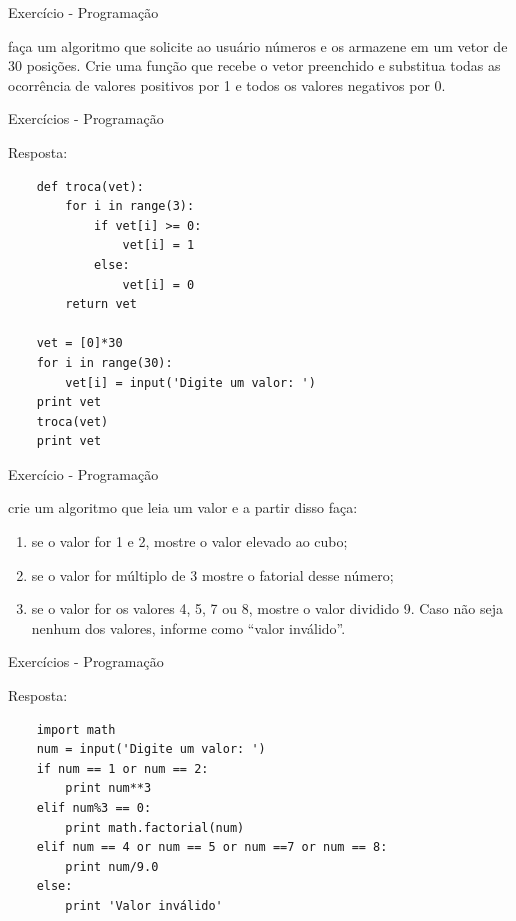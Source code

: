 \documentclass{beamer}
\begin{document}
\begin{frame}{Exercício - Programação}
	\label{exercicio_09}
	
	faça um algoritmo que solicite ao usuário números e os armazene em um vetor de 30 posições. Crie uma função que recebe o vetor preenchido e substitua todas as ocorrência de valores positivos por 1 e todos os valores negativos por 0.
	
\end{frame}

\begin{frame}[fragile]{Exercícios - Programação}
	\label{exercicio_09_resposta}
	
	Resposta:
	
\begin{verbatim}
	def troca(vet):
		for i in range(3):
			if vet[i] >= 0:
				vet[i] = 1
			else:
				vet[i] = 0
		return vet
	
	vet = [0]*30
	for i in range(30):
		vet[i] = input('Digite um valor: ')
	print vet
	troca(vet)
	print vet
\end{verbatim}

\end{frame}

\begin{frame}{Exercício - Programação}
\label{exercicio_10}

crie um algoritmo que leia um valor e a partir disso faça: 
\begin{enumerate}
	\item se o valor for 1 e 2, mostre o valor elevado ao cubo;
	\item se o valor for múltiplo de 3 mostre o fatorial desse número;
	\item se o valor for os valores 4, 5, 7 ou 8, mostre o valor dividido 9. Caso não seja nenhum dos valores, informe como “valor inválido”.
\end{enumerate}

\end{frame}

\begin{frame}[fragile]{Exercícios - Programação}
	\label{exercicio_10_resposta}
	
	Resposta:
	
	\begin{verbatim}
	import math
	num = input('Digite um valor: ')
	if num == 1 or num == 2:
		print num**3
	elif num%3 == 0:
		print math.factorial(num)
	elif num == 4 or num == 5 or num ==7 or num == 8:
		print num/9.0
	else:
		print 'Valor inválido'
	\end{verbatim}
	
\end{frame}
\end{document}
